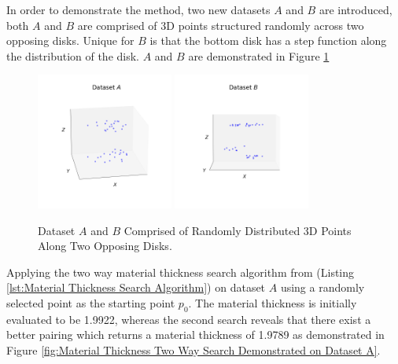 \documentclass[%
]{USN-MSc}
\begin{document}
In order to demonstrate the method, two new datasets \(A\) and \(B\) are introduced, both \(A\) and \(B\) are comprised of 3D points structured randomly across two opposing disks. Unique for \(B\) is that the bottom disk has a step function along the distribution of the disk. \(A\) and \(B\) are demonstrated in Figure \ref{fig:3D dataset a and b}

\begin{figure}[H]
    \centering
    \includegraphics[width=0.40\textwidth]{fig/3D dataset A.png}
    \includegraphics[width=0.40\textwidth]{fig/3D dataset B.png}
    \caption{Dataset \(A\) and \(B\) Comprised of Randomly Distributed 3D Points Along Two Opposing Disks.}
    \label{fig:3D dataset a and b}
\end{figure}


Applying the two way material thickness search algorithm from (Listing \ref{lst:Material Thickness Search Algorithm}) on dataset \(A\) using a randomly selected point as the starting point \(p_0\). The material thickness is initially evaluated to be 1.9922, whereas the second search reveals that there exist a better pairing which returns a material thickness of 1.9789 as demonstrated in Figure \ref{fig:Material Thickness Two Way Search Demonstrated on Dataset A}.
\end{document}
